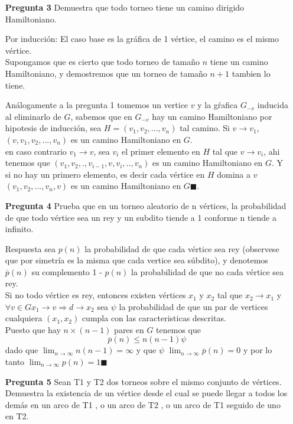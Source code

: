 \documentclass[12pt]{article}
\begin{document}
\begin{itemize}
\item[\bf{Pregunta 3}] Demuestra que todo torneo tiene un camino dirigido Hamiltoniano.
\item[Por inducción:]
      El caso base es la gráfica de 1 vértice, el camino es el mismo vértice.\\
      Supongamos que es cierto que todo torneo de tamaño $n$ tiene un camino Hamiltoniano, y demostremos que un torneo de tamaño $n+1$ tambien lo tiene.

      Análogamente a la pregunta 1 tomemos un vertice $v$ y la gŕafica $G_{-v}$ inducida al eliminarlo de $G$, sabemos que en $G_{-v}$ hay un camino Hamiltoniano por hipotesis de inducción, sea $H=(v_1,v_2,...,v_n)$ tal camino.
      Si $v \rightarrow v_{1}$, $(v,v_1,v_2,...,v_n)$ es un camino Hamiltoniano en $G$.\\
      en caso contrario $v_1 \rightarrow v$, sea $v_i$ el primer elemento en $H$ tal que $v \rightarrow v_i$, ahi tenemos que $(v_1,v_2,.,v_{i-1},v,v_i,..,v_n)$ es un camino Hamiltoniano en $G$.
      Y si no hay un primero elemento, es decir cada vértice en $H$ domina a $v$ $(v_1,v_2,...,v_n,v)$ es un camino Hamiltoniano en $G \blacksquare$.\\


\item[\bf{Pregunta 4}] Prueba que en un torneo aleatorio de n vértices, la probabilidad de que todo vértice sea un rey y un subdito tiende a 1 conforme n tiende a infinito.
\item[Respuesta] sea $p(n)$ la probabilidad de que cada vértice sea rey (observese que por simetría es la misma que cada vertice sea súbdito), y denotemos $\overline p(n)$ su complemento 1 - $p(n)$ la probabilidad de que no cada vértice sea rey.\\

Si no todo vértice es rey, entonces existen vértices $x_1$ y $x_2$ tal que $x_2 \rightarrow x_1$ y $\forall v \in G x_1 \rightarrow  v  \Rightarrow d \rightarrow x_2$
sea $\psi $ la probabilidad de que un par de vertices cualquiera $(x_1,x_2)$ cumpla con las caracteristicas descritas.\\
 Puesto que hay $n \times (n-1)$ pares en $G$ tenemos que $$\overline p(n) \leq n(n-1)\psi$$ dado que $ \lim_{n\to\infty} n(n-1) = \infty $ y que $\psi$  $ \lim_{n\to\infty} \overline p(n)=0 $ y por lo tanto $\lim_{n\to\infty} p(n)=1 \blacksquare$

\item[\bf{Pregunta 5}]Sean T1 y T2 dos torneos sobre el mismo conjunto de vértices. Demuestra la existencia de un vértice desde el cual se puede llegar a todos los demás en un arco de T1 , o un arco de T2 , o un arco de T1 seguido de uno en T2.


\end{itemize}
\end{document}
